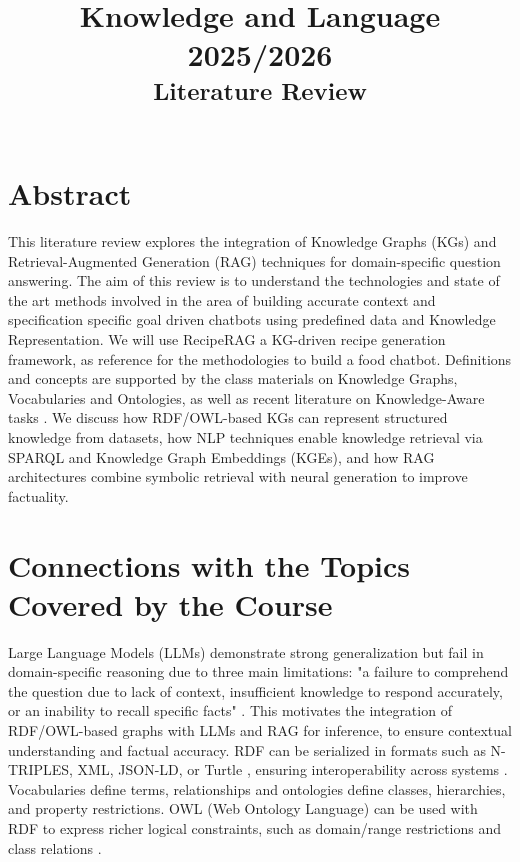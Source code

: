 \documentclass[conference]{IEEEtran}
\begin{document}
\title{Knowledge and Language 2025/2026 \\
{ \textsuperscript{{Literature Review}}}
}

\author{
\and
{}
}

\maketitle

\section{Abstract}
\noindent
This literature review explores the integration of Knowledge Graphs (KGs) and Retrieval-Augmented Generation (RAG) techniques for domain-specific question answering. The aim of this review is to understand the technologies and state of the art methods involved in the area of building accurate context and specification specific goal driven chatbots using predefined data and Knowledge Representation. We will use RecipeRAG \cite{loesch2025reciperag} a KG-driven recipe generation framework, as reference for the methodologies to build a food chatbot. Definitions and concepts are supported by the class materials on Knowledge Graphs, Vocabularies and Ontologies, as well as recent literature on Knowledge-Aware tasks \cite{agrawal2024kg_hallucinations}. We discuss how RDF/OWL-based KGs can represent structured knowledge from datasets, how NLP techniques enable knowledge retrieval via SPARQL and Knowledge Graph Embeddings (KGEs), and how RAG architectures combine symbolic retrieval with neural generation to improve factuality.
\section{Connections with the Topics Covered by the Course}

\noindent
Large Language Models (LLMs) demonstrate strong generalization but fail in domain-specific reasoning due to three main limitations: "a failure to comprehend the question due to lack of context, insufficient knowledge to respond accurately, or an inability to recall specific facts" \cite{agrawal2024kg_hallucinations}. This motivates the integration of RDF/OWL-based graphs with LLMs and RAG for inference, to ensure contextual understanding and factual accuracy.
\noindent
RDF can be serialized in formats such as N-TRIPLES, XML, JSON-LD, or Turtle \cite{KL2025slides}, ensuring interoperability across systems . Vocabularies define terms, relationships and ontologies define classes, hierarchies, and property restrictions.
OWL (Web Ontology Language) can be used with RDF to express richer logical constraints, such as domain/range restrictions and class relations \cite{KL2025slides}.
\end{document}
